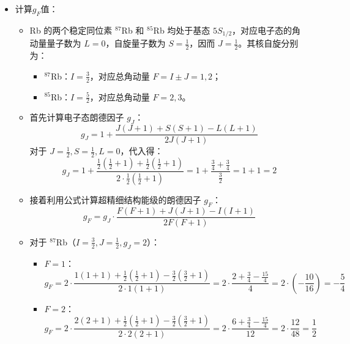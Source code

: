     \begin{itemize}
    
        \item 计算\(g_F\)值：

            \begin{itemize}
                \item Rb 的两个稳定同位素 $^{87}$Rb 和 $^{85}$Rb 均处于基态 $5S_{1/2}$，对应电子态的角动量量子数为 $L = 0$，自旋量子数为 $S = \frac{1}{2}$，因而 $J = \frac{1}{2}$。其核自旋分别为：
                    \begin{itemize}
                        \item $^{87}$Rb：$I = \frac{3}{2}$，对应总角动量 $F = I \pm J = 1, 2$；
                        \item $^{85}$Rb：$I = \frac{5}{2}$，对应总角动量 $F = 2, 3$。
                    \end{itemize}
                
                \item 首先计算电子态朗德因子 $g_J$：
                    \[
                    g_J = 1 + \frac{J(J+1) + S(S+1) - L(L+1)}{2J(J+1)}
                    \]
                    对于 $J = \frac{1}{2}, S = \frac{1}{2}, L = 0$，代入得：
                    \[
                    g_J = 1 + \frac{\frac{1}{2}(\frac{1}{2}+1) + \frac{1}{2}(\frac{1}{2}+1)}{2 \cdot \frac{1}{2}(\frac{1}{2}+1)} = 1 + \frac{\frac{3}{4} + \frac{3}{4}}{\frac{3}{2}} = 1 + 1 = 2
                    \]
                
                \item 接着利用公式计算超精细结构能级的朗德因子 $g_F$：
                    \[
                    g_F = g_J \cdot \frac{F(F+1) + J(J+1) - I(I+1)}{2F(F+1)}
                    \]
                
                \item 对于 $^{87}$Rb（$I = \frac{3}{2}, J = \frac{1}{2}, g_J = 2$）：
                    \begin{itemize}
                        \item $F = 1$：
                        \[
                        g_F = 2 \cdot \frac{1(1+1) + \frac{1}{2}(\frac{1}{2}+1) - \frac{3}{2}(\frac{3}{2}+1)}{2 \cdot 1(1+1)} = 2 \cdot \frac{2 + \frac{3}{4} - \frac{15}{4}}{4} = 2 \cdot \left( -\frac{10}{16} \right) = -\frac{5}{4}
                        \]
                        \item $F = 2$：
                        \[
                        g_F = 2 \cdot \frac{2(2+1) + \frac{1}{2}(\frac{1}{2}+1) - \frac{3}{2}(\frac{3}{2}+1)}{2 \cdot 2(2+1)} = 2 \cdot \frac{6 + \frac{3}{4} - \frac{15}{4}}{12} = 2 \cdot \frac{12}{48} = \frac{1}{2}
                        \]
                    \end{itemize}


\end{itemize}
\end{itemize}
